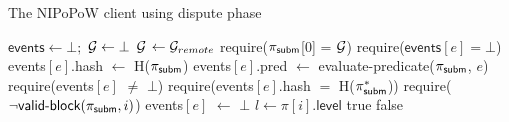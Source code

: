 \begin{algorithm}
    \caption{\label{alg:dispute}The \textsf{NIPoPoW} client using dispute phase}

    \begin{algorithmic}[1]

    \State $\textsf{events} \gets \bot;$ $\mathcal{G} \gets \bot$
        \State $\mathcal{G}$ $\gets \mathcal{G}_{remote}$
    \EndFunction
        \State \textsf{require}($\mathsf{\pi_{subm}}$[0] = $\mathcal{G}$)
        \State \textsf{require}($\textsf{events$[e]$} = \bot$)
        \State \textsf{events$[e]$.hash} $\gets$ \textsf{H}($\mathsf{\pi_{subm}}$)
        \State \textsf{events$[e]$.pred} $\gets$
        \textsf{evaluate-predicate}(\textsf{$\mathsf{\pi_{subm}}$}, $e$)
    \EndFunction
        \State \textsf{require}(\textsf{events}$[e]$ $\ne$ $\bot$)
        \State \textsf{require}(\textsf{events$[e]$.hash} $=$ \textsf{H}($\mathsf{\pi_{subm}^*}$))
        \State \textsf{require}($\neg \textsf{valid-block}(\mathsf{\pi_{subm}}, i)$)
        \State \textsf{events$[e]$} $\gets$ $\bot$
    \EndFunction
        \State $l\gets\pi[i].\mathsf{level}$
        \State \Return true
        \EndIf
        \State \Return false
    \EndFunction
    \EndContract
    \vskip8pt
    \end{algorithmic}
\end{algorithm}

